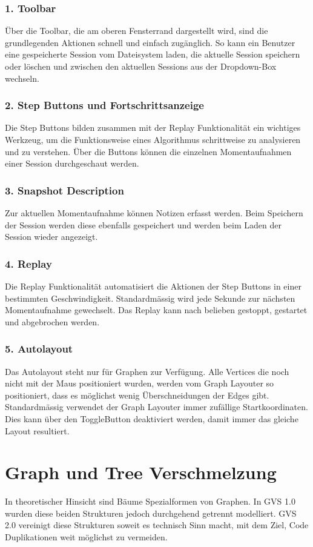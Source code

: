 \documentclass[11pt,a4paper,english,oneside]{book}
\numberwithin{equation}{chapter}
\begin{document}
	\subsubsection{1. Toolbar}
	Über die Toolbar, die am oberen Fensterrand dargestellt wird, sind die grundlegenden Aktionen schnell und einfach zugänglich. So kann ein Benutzer eine gespeicherte Session vom Dateisystem laden, die aktuelle Session speichern oder löschen und zwischen den aktuellen Sessions aus der Dropdown-Box wechseln. 
	
	\subsubsection{2. Step Buttons und Fortschrittsanzeige}
	Die Step Buttons bilden zusammen mit der Replay Funktionalität ein wichtiges Werkzeug, um die Funktionsweise eines Algorithmus schrittweise zu analysieren und zu verstehen. Über die Buttons können die einzelnen Momentaufnahmen einer Session durchgeschaut werden.
	
	\subsubsection{3. Snapshot Description}
	Zur aktuellen Momentaufnahme können Notizen erfasst werden. Beim Speichern der Session werden diese ebenfalls gespeichert und werden beim Laden der Session wieder angezeigt.
			
	\subsubsection{4. Replay}
	Die Replay Funktionalität automatisiert die Aktionen der Step Buttons in einer bestimmten Geschwindigkeit. Standardmässig wird jede Sekunde zur nächsten Momentaufnahme gewechselt. Das Replay kann nach belieben gestoppt, gestartet und abgebrochen werden.
	
	\subsubsection{5. Autolayout}
	Das Autolayout steht nur für Graphen zur Verfügung. Alle Vertices die noch nicht mit der Maus positioniert wurden, werden vom Graph Layouter so positioniert, dass es möglichst wenig Überschneidungen der Edges gibt. Standardmässig verwendet der Graph Layouter immer zufällige Startkoordinaten. Dies kann über den ToggleButton deaktiviert werden, damit immer das gleiche Layout resultiert.
	
	\section{Graph und Tree Verschmelzung} \label{graph-vs-tree}
	In theoretischer Hinsicht sind Bäume Spezialformen von Graphen. In GVS 1.0 wurden diese beiden Strukturen jedoch durchgehend getrennt modelliert. GVS 2.0 vereinigt diese Strukturen soweit es technisch Sinn macht, mit dem Ziel, Code Duplikationen weit möglichst zu vermeiden.
	
\end{document}
